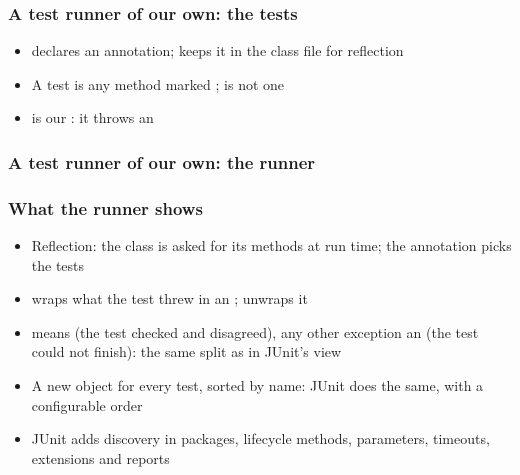 \documentclass[aspectratio=169,10pt,compress]{beamer}
\begin{document}




\begin{frame}[t,fragile] \frametitle{A test runner of our own: the tests}

	\begin{itemize}\footnotesize
		\item {} declares an annotation;  keeps it in the class file for reflection
		\item A test is any method marked ;  is not one
		\item {} is our : it throws an 
	\end{itemize}
\end{frame}




\begin{frame}[t,fragile] \frametitle{A test runner of our own: the runner}
\end{frame}




\begin{frame}[t,fragile] \frametitle{What the runner shows}
	\begin{itemize}\small
		\item Reflection: the class is asked for its methods at run time; the annotation picks the tests
		\item {} wraps what the test threw in an ;  unwraps it
		\item {} means  (the test checked and disagreed), any other exception an
			   (the test could not finish): the same split as in JUnit's view
		\item A new object for every test, sorted by name: JUnit does the same, with a configurable order
		\item JUnit adds discovery in packages, lifecycle methods, parameters, timeouts, extensions and reports
	\end{itemize}
\end{frame}
\end{document}
